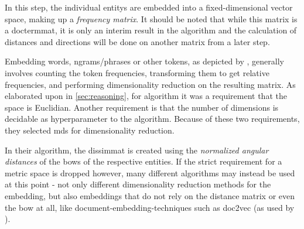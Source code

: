 In this step, the individual \glspl{entity} are embedded into a fixed-dimensional vector space, making up a \emph{frequency matrix}. It should be noted that while this matrix is a \gls{doctermmat}, it is only an interim result in the algorithm and the calculation of distances and directions will be done on another matrix from a later step.

Embedding words, \glspl{ngram}/phrases or other tokens, as depicted by \cite{Turney2010,Lowe}, generally involves counting the token frequencies, transforming them to get relative frequencies, and performing dimensionality reduction on the resulting matrix. As elaborated upon in \autoref{sec:reasoning}, for  algorithm it was a requirement that the space is Euclidian. Another requirement is that the number of dimensions is decidable as hyperparameter to the algorithm. Because of these two requirements, they selected \gls{mds} for dimensionality reduction.

In their algorithm, the \gls{dissimmat} is created using the \emph{normalized angular distances} of the \glspl{bow} of the respective entities. If the strict requirement for a metric space is dropped however, many different algorithms may instead be used at this point - not only different dimensionality reduction methods for the embedding, but also embeddings that do not rely on the distance matrix or even the \gls{bow} at all, like document-embedding-techniques such as \gls{doc2vec} \cite{Le2014} (as \eg used by \cite{Alshaikh2020}).




